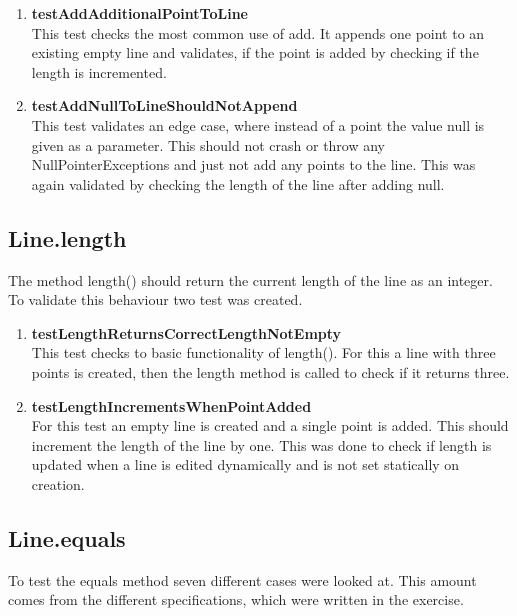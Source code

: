 \begin{enumerate}
    \item \textbf{testAddAdditionalPointToLine} \\
    This test checks the most common use of add. It appends one point to an existing empty line and validates, if the point is added by checking if the length is incremented. 
    \item \textbf{testAddNullToLineShouldNotAppend} \\
    This test validates an edge case, where instead of a point the value null is given as a parameter. This should not crash or throw any NullPointerExceptions and just not add any points to the line. This was again validated by checking the length of the line after adding null.
\end{enumerate}

\subsection{Line.length}
The method length() should return the current length of the line as an integer. To validate this behaviour two test was created.

\begin{enumerate}
    \item \textbf{testLengthReturnsCorrectLengthNotEmpty} \\
    This test checks to basic functionality of length(). For this a line with three points is created, then the length method is called to check if it returns three.
    \item \textbf{testLengthIncrementsWhenPointAdded} \\
    For this test an empty line is created and a single point is added. This should increment the length of the line by one. This was done to check if length is updated when a line is edited dynamically and is not set statically on creation.
\end{enumerate}

\subsection{Line.equals}
\label{sec:line_equals}
To test the equals method seven different cases were looked at. This amount comes from the different specifications, which were written in the exercise.

